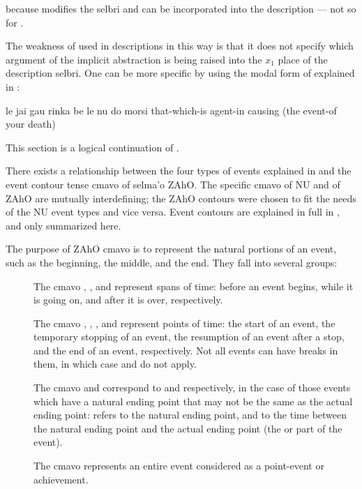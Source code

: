 {\noindent}because  modifies the selbri and can be incorporated
    into the description --- not so for . 

The weakness of  used in descriptions in this way is
    that it does not specify which argument of the implicit
    abstraction is being raised into the $x_1$ place of the
    description selbri. One can be more specific by using the modal
    form of  explained in :
\begin{example}
le jai gau rinka\n
\T	be le nu do morsi\n
that-which-is agent-in causing\n
\T	(the event-of your death)
\end{example}



This section is a logical continuation of .

There exists a relationship between the four types of events
    explained in  and the event contour
    tense cmavo of selma'o ZAhO. The specific cmavo of NU and of
    ZAhO are mutually interdefining; the ZAhO contours were chosen
    to fit the needs of the NU event types and vice versa. Event
    contours are explained in full in , and only summarized here.

The purpose of ZAhO cmavo is to represent the natural
    portions of an event, such as the beginning, the middle, and
    the end. They fall into several groups:
\begin{description}
\item[] The cmavo , , and  represent spans of time: before an event begins, while it is going on, and after it is over, respectively.
\item[] The cmavo , , , and  represent points of time: the start of an event, the temporary stopping of an event, the resumption of an event after a stop, and the end of an event, respectively. Not all events can have breaks in them, in which case  and  do not apply.
\item[] The cmavo  and  correspond to  and  respectively, in the case of those events which have a natural ending point that may not be the same as the actual ending point:  refers to the natural ending point, and  to the time between the natural ending point and the actual ending point (the  or  part of the event).
\item[] The cmavo  represents an entire event considered as a point-event or achievement.
\end{description}

